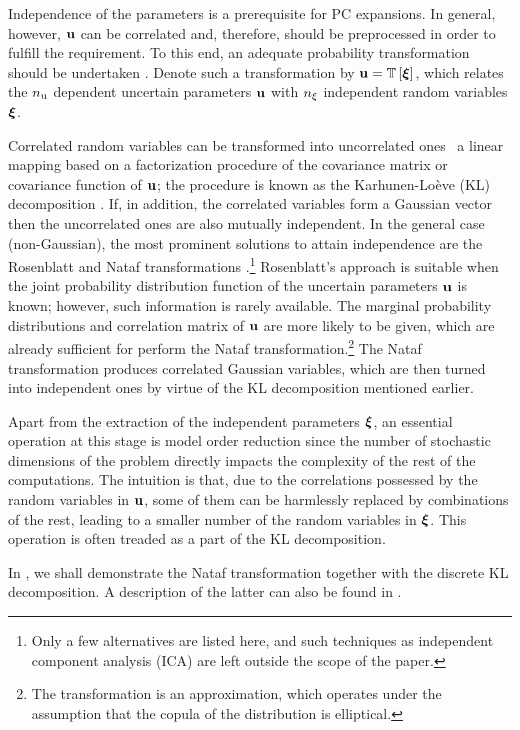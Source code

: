 Independence of the parameters is a prerequisite for PC expansions.
In general, however, $\mathbf{u}$ can be correlated and, therefore, should be preprocessed in order to fulfill the requirement.
To this end, an adequate probability transformation should be undertaken \cite{eldred2008}.
Denote such a transformation by $\vU = \oTransform{\vZ}$, which relates the ${n_\text{u}}$ dependent uncertain parameters $\mathbf{u}$ with ${n_\xi}$ independent random variables $\boldsymbol{\xi}$.

Correlated random variables can be transformed into uncorrelated ones \via\ a linear mapping based on a factorization procedure of the covariance matrix or covariance function of $\mathbf{u}$; the procedure is known as the Karhunen-Lo\`{e}ve (KL) decomposition \cite{ghanem1991}.
If, in addition, the correlated variables form a Gaussian vector then the uncorrelated ones are also mutually independent.
In the general case (non-Gaussian), the most prominent solutions to attain independence are the Rosenblatt \cite{rosenblatt1952} and Nataf transformations \cite{li2008}.\footnote{Only a few alternatives are listed here, and such techniques as independent component analysis (ICA) are left outside the scope of the paper.}
Rosenblatt's approach is suitable when the joint probability distribution function of the uncertain parameters $\mathbf{u}$ is known; however, such information is rarely available.
The marginal probability distributions and correlation matrix of $\mathbf{u}$ are more likely to be given, which are already sufficient for perform the Nataf transformation.\footnote{The transformation is an approximation, which operates under the assumption that the copula of the distribution is elliptical.}
The Nataf transformation produces correlated Gaussian variables, which are then turned into independent ones by virtue of the KL decomposition mentioned earlier.

Apart from the extraction of the independent parameters $\boldsymbol{\xi}$, an essential operation at this stage is model order reduction since the number of stochastic dimensions of the problem directly impacts the complexity of the rest of the computations.
The intuition is that, due to the correlations possessed by the random variables in $\mathbf{u}$, some of them can be harmlessly replaced by combinations of the rest, leading to a smaller number of the random variables in $\boldsymbol{\xi}$.
This operation is often treaded as a part of the KL decomposition.

In , we shall demonstrate the Nataf transformation together with the discrete KL decomposition.
A description of the latter can also be found in .
